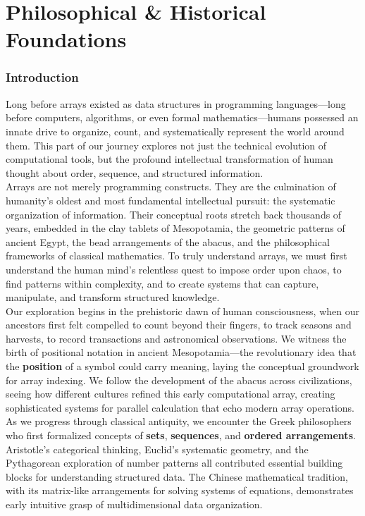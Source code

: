 \part{Philosophical \& Historical Foundations}


\section*{Introduction}

Long before arrays existed as data structures in programming languages—long before computers, algorithms, or even formal mathematics—humans possessed an innate drive to organize, count, and systematically represent the world around them. This part of our journey explores not just the technical evolution of computational tools, but the profound intellectual transformation of human thought about order, sequence, and structured information.\\
Arrays are not merely programming constructs. They are the culmination of humanity's oldest and most fundamental intellectual pursuit: the systematic organization of information. Their conceptual roots stretch back thousands of years, embedded in the clay tablets of Mesopotamia, the geometric patterns of ancient Egypt, the bead arrangements of the abacus, and the philosophical frameworks of classical mathematics. To truly understand arrays, we must first understand the human mind's relentless quest to impose order upon chaos, to find patterns within complexity, and to create systems that can capture, manipulate, and transform structured knowledge.\\
Our exploration begins in the prehistoric dawn of human consciousness, when our ancestors first felt compelled to count beyond their fingers, to track seasons and harvests, to record transactions and astronomical observations. We witness the birth of positional notation in ancient Mesopotamia—the revolutionary idea that the \textbf{position} of a symbol could carry meaning, laying the conceptual groundwork for array indexing. We follow the development of the abacus across civilizations, seeing how different cultures refined this early computational array, creating sophisticated systems for parallel calculation that echo modern array operations.\\
As we progress through classical antiquity, we encounter the Greek philosophers who first formalized concepts of \textbf{sets}, \textbf{sequences}, and \textbf{ordered arrangements}. Aristotle's categorical thinking, Euclid's systematic geometry, and the Pythagorean exploration of number patterns all contributed essential building blocks for understanding structured data. The Chinese mathematical tradition, with its matrix-like arrangements for solving systems of equations, demonstrates early intuitive grasp of multidimensional data organization.\\
